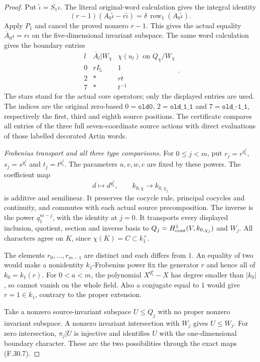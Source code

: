 \begin{proof}
Put $\widetilde\iota=S_1\iota$.
The literal original-word calculation gives
the integral identity
\[
 (r-1)(A_0\widetilde\iota-r\widetilde\iota)
       =\delta\,\operatorname{row}_1(A_0\widetilde\iota).
                                                               \tag{F.30.9}
\]
Apply $P_1$ and cancel the proved nonzero
$r-1$. This gives the actual equality
$\overline A_0\iota=r\iota$ on the five-dimensional
invariant subspace. The same word calculation
gives the boundary entries
\[
 \begin{array}{c|c|c}
 l&\overline A_l|W_\chi&\chi(u_l)\text{ on }Q_\chi/W_\chi\\\hline
 0&rI_5&1\\
 2&*&rt\\
 7&*&t^{-1}
 \end{array}.
                                                               \tag{F.30.10}
\]
The stars stand for the actual core operators;
only the displayed entries are used.
The indices are the original zero-based
$0=\texttt{old0}$,
$2=\texttt{old\_1\_1}$ and
$7=\texttt{old\_-1\_1}$, respectively the
first, third and eighth source positions.
The certificate compares all entries of the
three full seven-coordinate source actions
with direct evaluations of those labelled
decorated Artin words.

\emph{Frobenius transport and all three type comparisons.}
For $0\leq j<m$, put
$r_j=r^{q_1^j}$, $s_j=s^{q_1^j}$ and
$t_j=t^{q_1^j}$. The parameters $u,v,w,c$
are fixed by these powers.
The coefficient map
\[
 d\longmapsto d^{q_1^j},\qquad
 k_{0,\chi}\longrightarrow k_{0,\chi_j}
                                                               \tag{F.30.11}
\]
is additive and semilinear. It preserves the
cocycle rule, principal cocycles and continuity,
and commutes with each actual source precomposition.
The inverse is the power $q_1^{m-j}$, with
the identity at $j=0$.
It transports every displayed inclusion,
quotient, section and inverse basis to
$Q_j=H^1_{\rm cont}(V,k_{0,\chi_j})$ and $W_j$.
All characters agree on $K$, since
$\chi(K)=C\subset k_1^\times$.

The elements $r_0,\ldots,r_{m-1}$ are distinct
and each differs from $1$.
An equality of two would make a nonidentity
$k_1$-Frobenius power fix the generator $r$
and hence all of $k_0=k_1(r)$.
For $0<a<m$, the polynomial $X^{q_1^a}-X$
has degree smaller than $|k_0|$, so cannot
vanish on the whole field.
Also a conjugate equal to $1$ would give
$r=1\in k_1$, contrary to the proper extension.

Take a nonzero source-invariant subspace
$U\leq Q_j$ with no proper nonzero invariant
subspace. A nonzero invariant intersection
with $W_j$ gives $U\leq W_j$.
For zero intersection, $\pi_j|U$ is injective
and identifies $U$ with the one-dimensional
boundary character. These are the two
possibilities through the exact maps (F.30.7).


\end{proof}
